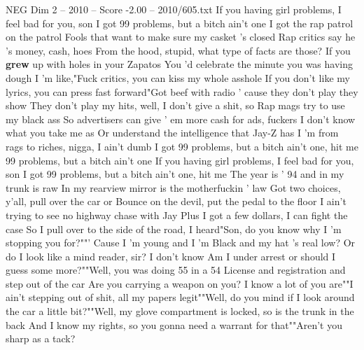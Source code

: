 \begin{textsample}{NEG Dim 2 – 2010 – Score -2.00 – 2010/605.txt}  \label{ex:f2_neg_014}
If you having girl problems, I feel bad for you, son I got 99 problems, but a bitch ain't one I got the rap patrol on the patrol Fools that want to make sure my casket 's closed Rap critics say he 's money, cash, hoes From the hood, stupid, what type of facts are those?
If you \textbf{grew} up with holes in your Zapatos You 'd celebrate the minute you was having dough I 'm like,"Fuck critics, you can kiss my whole asshole If you don't like my lyrics, you can press fast forward"Got beef with radio ' cause they don't play they show They don't play my hits, well, I don't give a shit, so Rap mags try to use my black ass So advertisers can give ' em more cash for ads, fuckers I don't know what you take me as Or understand the intelligence that Jay-Z has I 'm from rags to riches, nigga, I ain't dumb I got 99 problems, but a bitch ain't one, hit me 99 problems, but a bitch ain't one If you having girl problems, I feel bad for you, son I got 99 problems, but a bitch ain't one, hit me The year is ' 94 and in my trunk is raw In my rearview mirror is the motherfuckin ' law Got two choices, y'all, pull over the car or Bounce on the devil, put the pedal to the floor I ain't trying to see no highway chase with Jay Plus I got a few dollars, I can fight the case So I pull over to the side of the road, I heard"Son, do you know why I 'm stopping you for?""' Cause I 'm young and I 'm Black and my hat 's real low?
Or do I look like a mind reader, sir?
I don't know Am I under arrest or should I guess some more?""Well, you was doing 55 in a 54 License and registration and step out of the car Are you carrying a weapon on you?
I know a lot of you are""I ain't stepping out of shit, all my papers legit""Well, do you mind if I look around the car a little bit?""Well, my glove compartment is locked, so is the trunk in the back And I know my rights, so you gonna need a warrant for that""Aren't you sharp as a tack?

\end{textsample}
